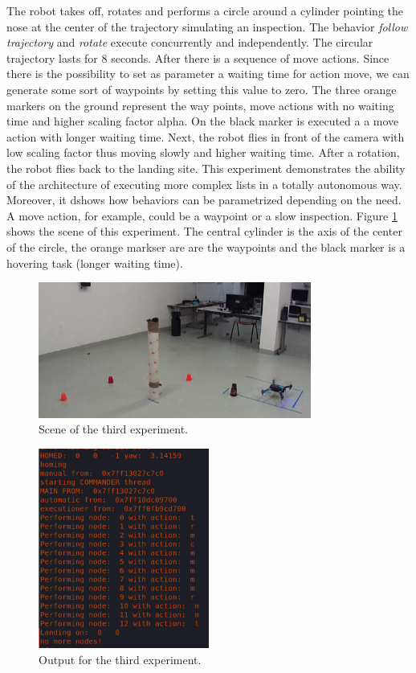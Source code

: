 The robot takes off, rotates and performs a circle around a cylinder pointing the nose at the center of the trajectory simulating an inspection. The behavior \textit{follow trajectory} and \textit{rotate} execute concurrently and independently. The circular trajectory lasts for 8 seconds. After there is a sequence of move actions. Since there is the possibility to set as parameter a waiting time for action move, we can generate some sort of waypoints by setting this value to zero. The three orange markers on the ground represent the way points, move actions with no waiting time and higher scaling factor alpha. On the black marker is executed a a move action with longer waiting time. Next, the robot flies in front of the camera with low scaling factor thus moving slowly and higher waiting time. After a rotation, the robot flies back to the landing site. This experiment demonstrates the ability of the architecture of executing more complex lists in a totally autonomous way. Moreover, it dshows how behaviors can be parametrized depending on the need. A move action, for example, could be a waypoint or a slow inspection. Figure \ref{figure:circle} shows the scene of this experiment. The central cylinder is the axis of the center of the circle, the orange markser are are the waypoints and the black marker is a hovering task (longer waiting time).

\begin{figure}[h]
\centering
 \includegraphics[width=0.8\textwidth]{circle.png}
 \caption{Scene of the third experiment.}
 \label{figure:circle}
\end{figure}


\begin{figure}[h]
\centering
 \includegraphics[width=0.5\textwidth]{snippet.png}
 \caption{Output for the third experiment.}
 \label{figure:snip}
\end{figure}













